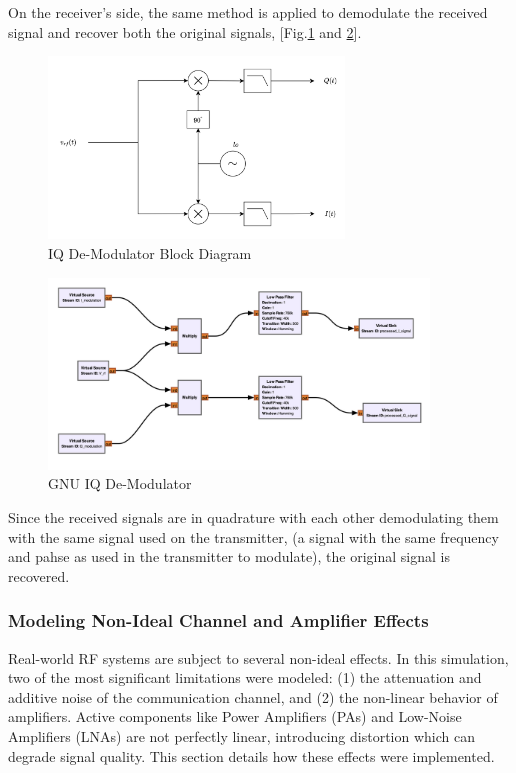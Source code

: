 On the receiver's side, the same method is applied to demodulate the received signal and 
recover both the original signals, [Fig.\ref{fig:IQDeMod_Diagram} and  
\ref{fig:GNU_IQDemod}]. 

\begin{figure}[H]
    \centering
    \includegraphics*[width=0.7\textwidth]{Images/IQ_Demod_Diagram.png}
    \caption{IQ De-Modulator Block Diagram}
    \label{fig:IQDeMod_Diagram}
\end{figure}

\begin{figure}[H]
    \centering
    \includegraphics*[width=0.9\textwidth]{Images/GNU_Digital_IQDemod.png}
    \caption{GNU IQ De-Modulator}
    \label{fig:GNU_IQDemod}
\end{figure}

Since the received signals are in quadrature with each other demodulating them with the 
same signal used on the transmitter, (a signal with the same frequency and pahse as 
used in the transmitter to modulate), the original signal is recovered.

\subsubsection{Modeling Non-Ideal Channel and Amplifier Effects}

Real-world RF systems are subject to several non-ideal effects. In this simulation, two of the most significant limitations were modeled: (1) the attenuation and additive noise of the communication channel, and (2) the non-linear behavior of amplifiers. Active components like Power Amplifiers (PAs) and Low-Noise Amplifiers (LNAs) are not perfectly linear, introducing distortion which can degrade signal quality. This section details how these effects were implemented.

